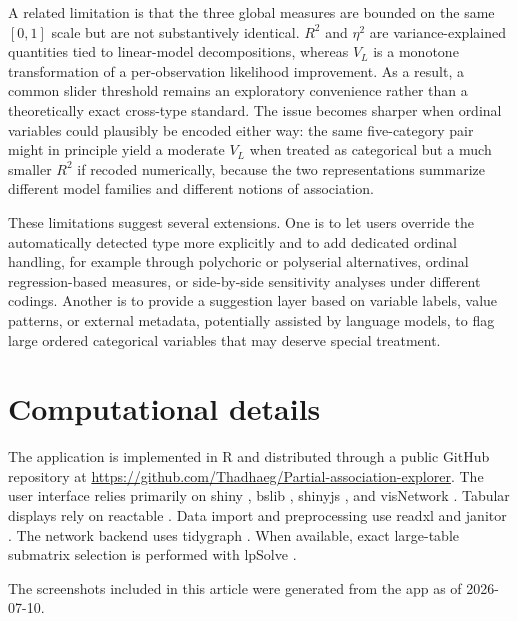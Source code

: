 \documentclass[11pt]{article}
\newcommand{\pkg}[1]{\textsf{#1}}
\newcommand{\proglang}[1]{\textsf{#1}}
\begin{document}
A related limitation is that the three global measures are bounded on the same
$[0,1]$ scale but are not substantively identical. $R^2$ and $\eta^2$ are
variance-explained quantities tied to linear-model decompositions, whereas
$V_L$ is a monotone transformation of a per-observation likelihood improvement.
As a result, a common slider threshold remains an exploratory convenience rather
than a theoretically exact cross-type standard. The issue becomes sharper when
ordinal variables could plausibly be encoded either way: the same five-category
pair might in principle yield a moderate $V_L$ when treated as categorical but
a much smaller $R^2$ if recoded numerically, because the two representations
summarize different model families and different notions of association.

These limitations suggest several extensions. One is to let users override the
automatically detected type more explicitly and to add dedicated ordinal
handling, for example through polychoric or polyserial alternatives, ordinal
regression-based measures, or side-by-side sensitivity analyses under different
codings. Another is to provide a suggestion layer based on variable labels,
value patterns, or external metadata, potentially assisted by language models,
to flag large ordered categorical variables that may deserve special treatment.

\section*{Computational details}

The application is implemented in \proglang{R} and distributed through a public
GitHub repository at
\url{https://github.com/Thadhaeg/Partial-association-explorer}. The user
interface relies primarily on \pkg{shiny} \citep{Shiny}, \pkg{bslib}
\citep{bslib}, \pkg{shinyjs} \citep{shinyjs}, and \pkg{visNetwork}
\citep{VisNetwork}. Tabular displays rely on \pkg{reactable}
\citep{reactable}. Data import and preprocessing use \pkg{readxl}
\citep{readxl} and \pkg{janitor} \citep{janitor}. The network backend uses
\pkg{tidygraph} \citep{tidygraph}. When available, exact large-table submatrix
selection is performed with \pkg{lpSolve} \citep{lpSolve}.

The screenshots included in this article were generated from the app as of
2026-07-10.
\end{document}
